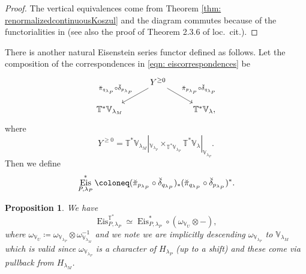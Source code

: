 \documentclass{amsart}
\newtheorem{proposition}[theorem]{Proposition}
\theoremstyle{definition}
\theoremstyle{remark}
\numberwithin{equation}{section}
\DeclareMathOperator{\Eis}{\mathrm{Eis}}
\newcommand{\V}{\mathbb{V}}
\newcommand{\T}{\mathbb{T}}
\begin{document}
\begin{proof}
The vertical equivalences come from Theorem \ref{thm: renormalizedcontinuousKoszul} and the diagram commutes because of the functorialities in \cite[Theorem 2.2.10, Proposition 2.3.3]{Chen2023categorical} (see also the proof of Theorem 2.3.6 of loc.~cit.).
\end{proof}

There is another natural Eisenstein series functor defined as follows. Let the composition of the correspondences in \eqref{eqn: eiscorrespondences} be
\begin{equation}{\label{eqn: Ycorrcomp}}
    \begin{tikzcd}
        & Y^{\geq 0} \arrow[dl, swap, "\breve{\pi}_{q_{\lambda_P}} \circ \breve{\delta}_{p_{\lambda_P}}"] \arrow[dr, " \breve{\pi}_{p_{\lambda_P}} \circ \breve{\delta}_{q_{\lambda_P}}"]& \\
       \T^{\ast}\V_{\lambda_M} &  & \T^{\ast}\V_{\lambda} ,
    \end{tikzcd}
\end{equation}
where
\begin{equation*}
    Y^{\geq 0} = \T^{\ast}\V_{\lambda_M}|_{\V_{\lambda_P}} \times_{\T^{\ast} \V_{\lambda_P}} \T^{\ast} \V_\lambda |_{\V_{\lambda_P}}.
\end{equation*}
Then we define
\begin{equation}{\label{eq: stareis}}
    \Eis^{\ast}_{P,\lambda_P} \coloneq (\breve{\pi}_{p_{\lambda_P}} \circ \breve{\delta}_{q_{\lambda_P}})_{\ast} (\breve{\pi}_{q_{\lambda_P}} \circ \breve{\delta}_{p_{\lambda_P}})^{\ast}.
\end{equation}
\begin{proposition}{\label{prop: cotaneiscompatibility}}
    We have
    \begin{equation*}
       \Eis^{\T^{\ast}}_{P,\lambda_P} \simeq \Eis^{\ast}_{P,\lambda_P} \circ  (\omega_{\V_{U}} \otimes -), 
    \end{equation*}
    where $\omega_{\V_{U}} \coloneq \omega_{\V_{\lambda_P}} \otimes \omega^{-1}_{\V_{\lambda_M}}$ and we note we are implicitly descending $\omega_{\V_{\lambda_P}}$ to $\V_{\lambda_M}$ which is valid since $\omega_{\V_{\lambda_P}}$ is a character of $H_{\lambda_P}$ (up to a shift) and these come via pullback from $H_{\lambda_M}$.
\end{proposition}
\end{document}

